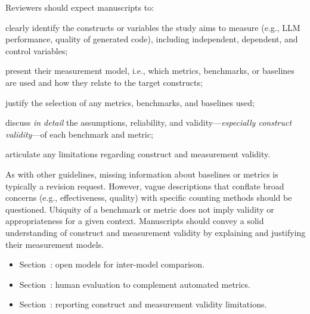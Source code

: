 Reviewers should expect manuscripts to:
\begin{enumerate*}
    \item clearly identify the constructs or variables the study aims to measure (e.g., LLM performance, quality of generated code), including independent, dependent, and control variables;
    \item present their measurement model, i.e., which metrics, benchmarks, or baselines are used and how they relate to the target constructs;
    \item justify the selection of any metrics, benchmarks, and baselines used;
    \item discuss \textit{in detail} the assumptions, reliability, and validity---\textit{especially construct validity}---of each benchmark and metric;
    \item articulate any limitations regarding construct and measurement validity.
\end{enumerate*}
As with other guidelines, missing information about baselines or metrics is typically a revision request. However, vague descriptions that conflate broad concerns (e.g., effectiveness, quality) with specific counting methods should be questioned. Ubiquity of a benchmark or metric does not imply validity or appropriateness for a given context. Manuscripts should convey a solid understanding of construct and measurement validity by explaining and justifying their measurement models.

\begin{itemize}[label=$\rightarrow$]
    \item Section~\openllm: open models for inter-model comparison.
    \item Section~\humanvalidation: human evaluation to complement automated metrics.
    \item Section~\limitationsmitigations: reporting construct and measurement validity limitations.
\end{itemize}